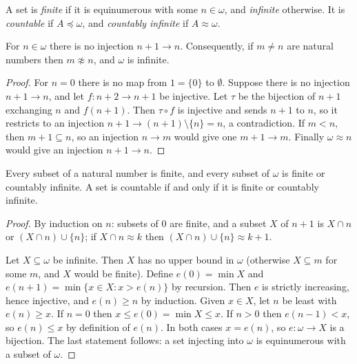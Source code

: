 \begin{definition}\label{sets:definition-finite}
A set is \emph{finite} if it is equinumerous with some $n \in \omega$, and
\emph{infinite} otherwise. It is \emph{countable} if $A \preceq \omega$, and
\emph{countably infinite} if $A \approx \omega$.
\end{definition}

\begin{proposition}\label{sets:proposition-pigeonhole}
For $n \in \omega$ there is no injection $n + 1 \to n$. Consequently, if $m \neq n$
are natural numbers then $m \not\approx n$, and $\omega$ is infinite.
\end{proposition}

\begin{proof}
For $n = 0$ there is no map from $1 = \{0\}$ to $\emptyset$. Suppose there is no
injection $n + 1 \to n$, and let $f \colon n + 2 \to n + 1$ be injective. Let
$\tau$ be the bijection of $n + 1$ exchanging $n$ and $f(n+1)$. Then
$\tau \circ f$ is injective and sends $n + 1$ to $n$, so it restricts to an
injection $n + 1 \to (n + 1) \setminus \{n\} = n$, a contradiction. If $m < n$,
then $m + 1 \subseteq n$, so an injection $n \to m$ would give one
$m + 1 \to m$. Finally $\omega \approx n$ would give an injection
$n + 1 \to n$.
\end{proof}

\begin{proposition}\label{sets:proposition-subsets-of-omega}
Every subset of a natural number is finite, and every subset of $\omega$ is
finite or countably infinite. A set is countable if and only if it is finite
or countably infinite.
\end{proposition}

\begin{proof}
By induction on $n$: subsets of $0$ are finite, and a subset $X$ of $n + 1$
is $X \cap n$ or $(X \cap n) \cup \{n\}$; if $X \cap n \approx k$ then
$(X \cap n) \cup \{n\} \approx k + 1$.

Let $X \subseteq \omega$ be infinite. Then $X$ has no upper bound in $\omega$
(otherwise $X \subseteq m$ for some $m$, and $X$ would be finite). Define
$e(0) = \min X$ and $e(n + 1) = \min\{x \in X : x > e(n)\}$ by recursion. Then
$e$ is strictly increasing, hence injective, and $e(n) \geq n$ by induction.
Given $x \in X$, let $n$ be least with $e(n) \geq x$. If $n = 0$ then
$x \leq e(0) = \min X \leq x$. If $n > 0$ then $e(n - 1) < x$, so
$e(n) \leq x$ by definition of $e(n)$. In both cases $x = e(n)$, so
$e \colon \omega \to X$ is a bijection. The last statement follows: a set injecting
into $\omega$ is equinumerous with a subset of $\omega$.
\end{proof}


